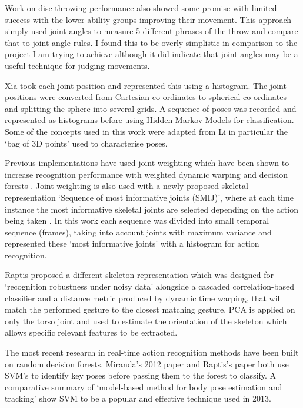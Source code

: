 Work on disc throwing performance\cite{Yamaoka2013} also showed some promise with limited success with the lower ability groups improving their movement. This approach simply used joint angles to measure 5 different phrases of the throw and compare that to joint angle rules. I found this to be overly simplistic in comparison to the project I am trying to achieve although it did indicate that joint angles may be a useful technique for judging movements.

Xia took each joint position and represented this using a histogram. \cite{hmm1} The joint positions were converted from Cartesian co-ordinates to spherical co-ordinates and splitting the sphere into several grids. A sequence of poses was recorded and represented as histograms before using Hidden Markov Models for classification.  Some of the concepts used in this work were adapted from Li \cite{3dbag} in particular the `bag of 3D points' used to characterise poses.

Previous implementations have used joint weighting which have been shown to increase recognition performance with weighted dynamic warping\cite{dtw1} and decision forests \cite{randforest}. Joint weighting is also used with a newly proposed skeletal representation `Sequence of most informative joints (SMIJ)', where at each time instance the most informative skeletal joints are selected depending on the action being taken \cite{SMIJ}. In this work each sequence was divided into small temporal sequence (frames), taking into account joints with maximum variance and represented these `most informative joints' with a histogram for action recognition.

Raptis proposed a different skeleton representation which was designed for `recognition robustness under noisy data'\cite{Raptis2011a} alongside a cascaded correlation-based classifier and a distance metric produced by dynamic time warping, that will match the performed gesture to the closest matching gesture.\cite{Kaewplee}
PCA is applied on only the torso joint and used to estimate the orientation of the skeleton which allows specific relevant features to be extracted.


The most recent research in real-time action recognition methods have been built on random decision forests.\cite{randforest} \cite{Miranda2014} Miranda's 2012 paper\cite{Miranda2012}  and Raptis's paper \cite{Raptis2011a} both use SVM's to identify key poses before passing them to the forest to classify. A comparative summary of `model-based method for body pose estimation and tracking'\cite{Manjuatha2014} show SVM to be a popular and effective technique used in 2013.



